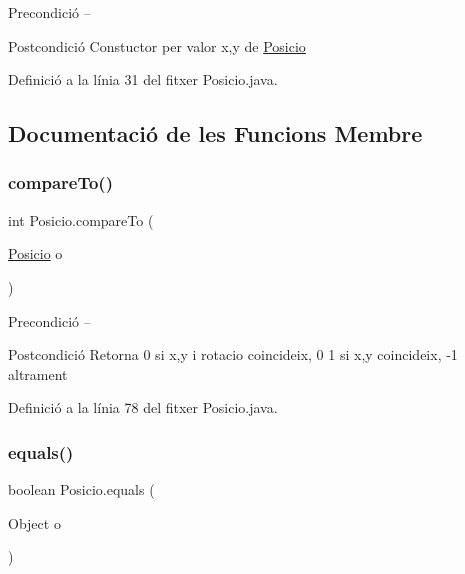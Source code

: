 \begin{DoxyPrecond}{Precondició}
-- 
\end{DoxyPrecond}
\begin{DoxyPostcond}{Postcondició}
Constuctor per valor x,y de \mbox{\hyperlink{class_posicio}{Posicio}} 
\end{DoxyPostcond}


Definició a la línia 31 del fitxer Posicio.\+java.



\subsection{Documentació de les Funcions Membre}
\mbox{\label{class_posicio_a32c10a9021c636eee8dcbe85f348389a}} 
\subsubsection{\texorpdfstring{compare\+To()}{compareTo()}}
{\footnotesize\ttfamily int Posicio.\+compare\+To (\begin{DoxyParamCaption}\item[{\mbox{\hyperlink{class_posicio}{Posicio}}}]{o }\end{DoxyParamCaption})}

\begin{DoxyPrecond}{Precondició}
-- 
\end{DoxyPrecond}
\begin{DoxyPostcond}{Postcondició}
Retorna 0 si x,y i rotacio coincideix, 0 1 si x,y coincideix, -\/1 altrament 
\end{DoxyPostcond}


Definició a la línia 78 del fitxer Posicio.\+java.

\mbox{\label{class_posicio_aace143f99edb1146822d21ed40e9217d}} 
\subsubsection{\texorpdfstring{equals()}{equals()}}
{\footnotesize\ttfamily boolean Posicio.\+equals (\begin{DoxyParamCaption}\item[{Object}]{o }\end{DoxyParamCaption})}

